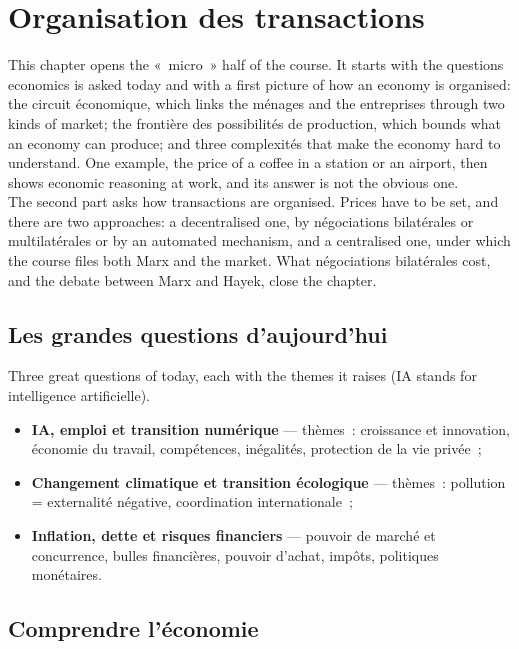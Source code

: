 \section{Organisation des transactions}

This chapter opens the «~micro~» half of the course. It starts with the questions
economics is asked today and with a first picture of how an economy is organised:
the circuit économique, which links the ménages and the entreprises through two
kinds of market; the frontière des possibilités de production, which bounds what an
economy can produce; and three complexités that make the economy hard to
understand. One example, the price of a coffee in a station or an airport, then
shows economic reasoning at work, and its answer is not the obvious one.\\

The second part asks how transactions are organised. Prices have to be set, and
there are two approaches: a decentralised one, by négociations bilatérales or
multilatérales or by an automated mechanism, and a centralised one, under which the course files
both Marx and the market. What
négociations bilatérales cost, and the debate between Marx and Hayek, close the
chapter.

\subsection{Les grandes questions d'aujourd'hui}

Three great questions of today, each with the themes it raises (IA stands for
intelligence artificielle).

\begin{itemize}
  \item \textbf{IA, emploi et transition numérique} --- thèmes~: croissance et
    innovation, économie du travail, compétences, inégalités, protection de la vie
    privée~;
  \item \textbf{Changement climatique et transition écologique} --- thèmes~:
    pollution = externalité négative, coordination internationale~;
  \item \textbf{Inflation, dette et risques financiers} --- pouvoir de marché et
    concurrence, bulles financières, pouvoir d'achat, impôts, politiques
    monétaires.
\end{itemize}

\subsection{Comprendre l'économie}

